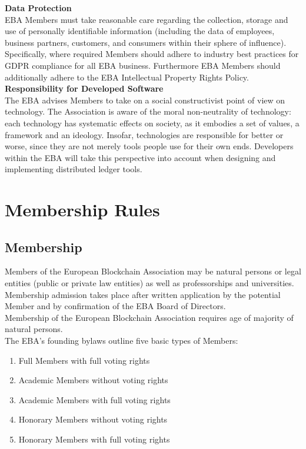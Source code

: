 \documentclass{article}
\begin{document}
\textbf{Data Protection} \\

EBA Members must take reasonable care regarding the collection, storage and use of personally identifiable information (including the data of employees, business partners, customers, and consumers within their sphere of influence). 
Specifically, where required Members should adhere to industry best practices for GDPR compliance for all EBA business. 
Furthermore EBA Members should additionally adhere to the EBA Intellectual Property Rights Policy. \\

\textbf{Responsibility for Developed Software} \\

The EBA advises Members to take on a social constructivist point of view on technology. 
The Association is aware of the moral non-neutrality of technology: each technology has systematic effects on society, as it embodies a set of values, a framework and an ideology. 
Insofar, technologies are responsible for better or worse, since they are not merely tools people use for their own ends. 
Developers within the EBA will take this perspective into account when designing and implementing distributed ledger tools.

\newpage

\section{Membership Rules}

\subsection{Membership}

Members of the European Blockchain Association may be natural persons or legal entities (public or private law entities) as well as professorships and universities. 
Membership admission takes place after written application by the potential Member and by confirmation of the EBA Board of Directors. \\

Membership of the European Blockchain Association requires age of majority of natural persons.\\

The EBA's founding bylaws outline five basic types of Members:

\begin{enumerate}
	\item {Full Members with full voting rights} 
	\item Academic Members without voting rights
	\item Academic Members with full voting rights
	\item Honorary Members without voting rights
	\item Honorary Members with full voting rights
\end{enumerate}
\end{document}

